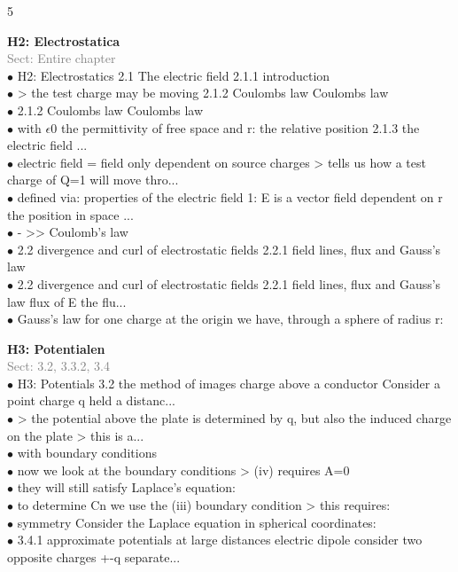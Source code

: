 \documentclass[7pt,a4paper]{article}
\begin{document}
\begin{multicols*}{5}


\textbf{H2: Electrostatica}\\\textcolor{gray}{{Sect: Entire chapter}}\\\vspace{0.5pt}
$\bullet$ H2: Electrostatics
2.1 The electric field
2.1.1 introduction\\
$\bullet$ > the test charge may be moving
2.1.2 Coulombs law
Coulombs law\\
$\bullet$ 2.1.2 Coulombs law
Coulombs law\\
$\bullet$ with $\epsilon$0 the permittivity of free space and r:    the relative position
2.1.3 the electric field
...\\
$\bullet$ electric field = field only dependent on source charges
> tells us how a test charge of Q=1 will move thro...\\
$\bullet$ defined via:
properties of the electric field 1: E is a vector field dependent on r the position in space ...\\
$\bullet$ -     >> Coulomb's law\\
$\bullet$ 2.2 divergence and curl of electrostatic fields
2.2.1 field lines, flux and Gauss's law\\
$\bullet$ 2.2 divergence and curl of electrostatic fields
2.2.1 field lines, flux and Gauss's law
flux of E the flu...\\
$\bullet$ Gauss's law for one charge at the origin we have, through a sphere of radius r:\\
\columnbreak

\textbf{H3: Potentialen}\\\textcolor{gray}{{Sect: 3.2, 3.3.2, 3.4}}\\\vspace{0.5pt}
$\bullet$ H3: Potentials
3.2 the method of images
charge above a conductor Consider a point charge q held a distanc...\\
$\bullet$ > the potential above the plate is determined by q, but also the induced charge on the plate
 > this is a...\\
$\bullet$ with boundary conditions\\
$\bullet$ now we look at the boundary conditions
> (iv) requires A=0\\
$\bullet$ they will still satisfy Laplace's equation:\\
$\bullet$ to determine Cn we use the (iii) boundary condition
> this requires:\\
$\bullet$ symmetry
Consider the Laplace equation in spherical coordinates:\\
$\bullet$ 3.4.1 approximate potentials at large distances
electric dipole consider two opposite charges +-q separate...\\
\columnbreak


\end{multicols*}
\end{document}
